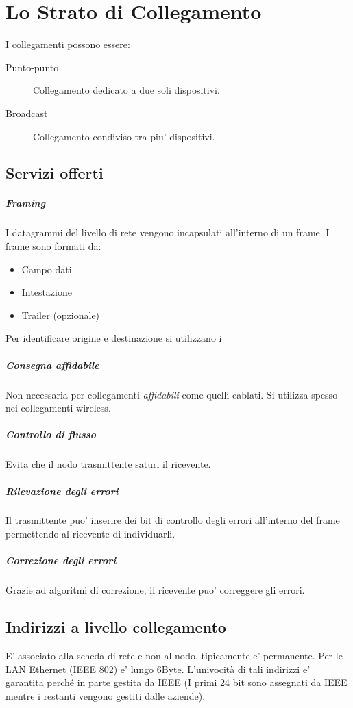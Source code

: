 \chapter{Lo Strato di Collegamento}
I collegamenti possono essere:
\begin{description}
    \item[Punto-punto] Collegamento dedicato a due soli dispositivi.
    \item[Broadcast] Collegamento condiviso tra piu' dispositivi.
\end{description}
\section{Servizi offerti}
\paragraph{Framing}
I datagrammi del livello di rete vengono incapsulati all'interno di un frame. I frame sono formati da:
\begin{itemize}
    \item Campo dati
    \item Intestazione
    \item Trailer (opzionale)
\end{itemize}
Per identificare origine e destinazione si utilizzano i 
\paragraph{Consegna affidabile}
Non necessaria per collegamenti \textit{affidabili} come quelli cablati. Si utilizza spesso nei collegamenti wireless.
\paragraph{Controllo di flusso}
Evita che il nodo trasmittente saturi il ricevente.
\paragraph{Rilevazione degli errori}
Il trasmittente puo' inserire dei bit di controllo degli errori all'interno del frame permettendo al ricevente di individuarli.
\paragraph{Correzione degli errori}
Grazie ad algoritmi di correzione, il ricevente puo' correggere gli errori.
\section{Indirizzi a livello collegamento}
E' associato alla scheda di rete e non al nodo, tipicamente e' permanente. Per le LAN Ethernet (IEEE 802) e' lungo 6Byte. L'univocità di tali indirizzi e' garantita perché in parte gestita da IEEE (I primi 24 bit sono assegnati da IEEE mentre i restanti vengono gestiti dalle aziende).
